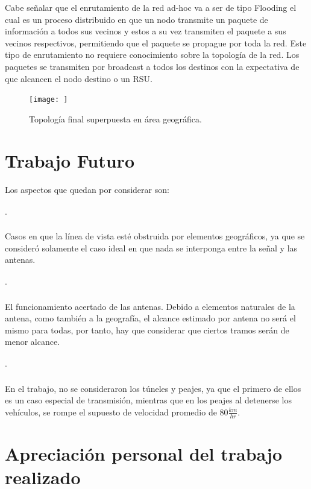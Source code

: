 \documentclass[12pt]{article}
\begin{document}
Cabe señalar que el enrutamiento de la red ad-hoc va a ser de tipo Flooding el cual es un proceso 
distribuido en que un nodo transmite un paquete de información a todos sus vecinos y estos a su vez 
transmiten el paquete a sus vecinos respectivos, permitiendo que el paquete se propague por toda la red. 
Este tipo de enrutamiento no requiere conocimiento sobre la topología de la red. Los paquetes se 
transmiten por broadcast a todos los destinos con la expectativa de que alcancen el nodo destino o un RSU.

\begin{figure}[H]
  \centering
      \texttt{[image: ]}
	    \caption{Topología final superpuesta en área geográfica.}
	\label{fig:top_final}
\end{figure}

\newpage
\section{Trabajo Futuro}
Los aspectos que quedan por considerar son:\\
\paragraph{$\cdot$}Casos en que la línea de vista esté obstruida por elementos geográficos, ya que se 
consideró solamente el caso ideal en que nada se interponga entre la señal y las antenas.
\paragraph{$\cdot$}El funcionamiento acertado de las antenas. Debido a elementos naturales de la antena, 
como también a la geografía, el alcance estimado por antena no será el mismo para todas, por tanto, hay 
que considerar que ciertos tramos serán de menor alcance.
\paragraph{$\cdot$}En el trabajo, no se consideraron los túneles y peajes, ya que el primero de ellos es 
un caso especial de transmisión, mientras que en los peajes al detenerse los vehículos, se rompe el 
supuesto de velocidad promedio de $80 \frac{km}{hr}.$

\newpage
\section{Apreciación personal del trabajo realizado}
\end{document}
